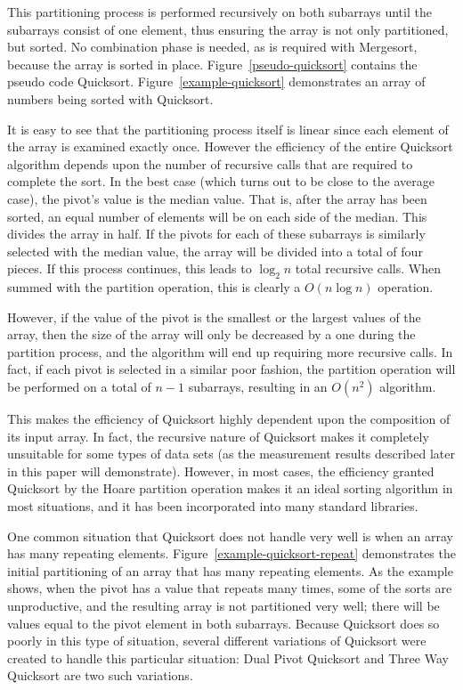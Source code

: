\documentclass{article}
\begin{document}
This partitioning process is performed recursively on both subarrays until the subarrays consist
of one element, thus ensuring the array is not only partitioned, but sorted. No combination phase is 
needed, as is required with Mergesort, because the array is sorted in place. 
Figure~\ref{pseudo-quicksort} contains the pseudo code Quicksort. 
Figure~\ref{example-quicksort} demonstrates an array of numbers being sorted with Quicksort.

It is easy to see that the partitioning process itself is linear since each element of the array
is examined exactly once. However the efficiency of the entire Quicksort algorithm depends
upon the number of recursive calls that are required to complete the sort. In the best case
(which turns out to be close to the average case), the pivot's value is the median value. That is, 
after the array has been sorted, an equal number of elements will be on each side of the median. 
This divides the array in half. If the pivots for each of these subarrays is similarly selected with the
median value, the array will be divided into a total of four pieces. If this process continues,
this leads to $\log_2n$ total recursive calls. When summed with the partition operation, this is
clearly a $O(n \log n)$ operation.

However, if the value of the pivot is the smallest or the largest values of the array, 
then the size of the array will only be decreased by a one during the partition process, and the 
algorithm will end up requiring more recursive calls. In fact, if each pivot
is selected in a similar poor fashion, the partition operation will be performed on a total of $n-1$ 
subarrays, resulting in an $O(n^2)$ algorithm.

This makes the efficiency of Quicksort highly dependent upon the composition of its input
array. In fact, the recursive nature of Quicksort makes it completely unsuitable for some types
of data sets (as the measurement results described later in this paper will demonstrate). 
However, in most cases, the efficiency granted Quicksort by the Hoare partition operation makes
it an ideal sorting algorithm in most situations, and it has been incorporated into many standard
libraries.

One common situation that Quicksort does not handle very well is when an array has many 
repeating elements. Figure~\ref{example-quicksort-repeat} demonstrates the initial partitioning
of an array that has many repeating elements. As the example shows, when the pivot has a value
that repeats many times, some of the sorts are unproductive, and the resulting array is
not partitioned very well; there will be values equal to the pivot element in both subarrays.
Because Quicksort does so poorly in this type of situation, several different variations of Quicksort
were created to handle this particular situation: Dual Pivot Quicksort and Three Way Quicksort
are two such variations.
\end{document}
